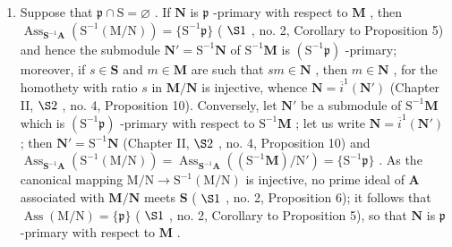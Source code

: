 \begin{enumerate}
\def\labelenumi{(\roman{enumi})}
\setcounter{enumi}{1}
\tightlist
\item
  Suppose that \(\mathfrak{p} \cap \mathrm{S} = \varnothing\) . If \(\mathbf{N}\) is \(\mathfrak{p}\) -primary with respect to \(\mathbf{M}\) , then \(\operatorname{Ass}_{\mathbf{S}^{-1}\mathbf{A}}(\mathrm{S}^{-1}(\mathrm{M/N})) = \{\mathrm{S}^{-1}\mathfrak{p}\}\) ( \(\S 1\) , no. 2, Corollary to Proposition 5) and hence the submodule \(\mathbf{N}' = \mathrm{S}^{-1}\mathbf{N}\) of \(\mathrm{S}^{-1}\mathbf{M}\) is \((\mathrm{S}^{-1}\mathfrak{p})\) -primary; moreover, if \(s \in \mathbf{S}\) and \(m \in \mathbf{M}\) are such that \(sm \in \mathbf{N}\) , then \(m \in \mathbf{N}\) , for the homothety with ratio \(s\) in \(\mathbf{M/N}\) is injective, whence \(\mathbf{N} = \overline{i}^{1}(\mathbf{N}')\) (Chapter II, \(\S 2\) , no. 4, Proposition 10). Conversely, let \(\mathbf{N}'\) be a submodule of \(\mathrm{S}^{-1}\mathbf{M}\) which is \((\mathrm{S}^{-1}\mathfrak{p})\) -primary with respect to \(\mathrm{S}^{-1}\mathbf{M}\) ; let us write \(\mathbf{N} = \overline{i}^{1}(\mathbf{N}')\) ; then \(\mathbf{N}' = \mathrm{S}^{-1}\mathbf{N}\) (Chapter II, \(\S 2\) , no. 4, Proposition 10) and \(\operatorname{Ass}_{\mathbf{S}^{-1}\mathbf{A}}(\mathrm{S}^{-1}(\mathrm{M/N})) = \operatorname{Ass}_{\mathbf{S}^{-1}\mathbf{A}}((\mathrm{S}^{-1}\mathbf{M})/\mathrm{N}') = \{\mathrm{S}^{-1}\mathfrak{p}\}\) . As the canonical mapping \(\mathrm{M/N} \to \mathrm{S}^{-1}(\mathrm{M/N})\) is injective, no prime ideal of \(\mathbf{A}\) associated with \(\mathbf{M/N}\) meets \(\mathbf{S}\) ( \(\S 1\) , no. 2, Proposition 6); it follows that \(\operatorname{Ass}(\mathrm{M/N}) = \{\mathfrak{p}\}\) ( \(\S 1\) , no. 2, Corollary to Proposition 5), so that \(\mathbf{N}\) is \(\mathfrak{p}\) -primary with respect to \(\mathbf{M}\) .
\end{enumerate}

